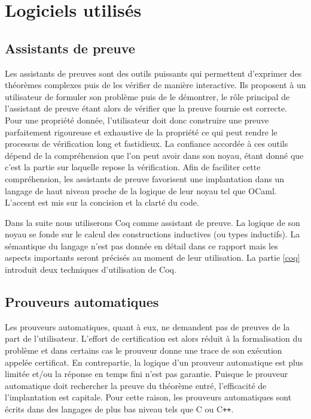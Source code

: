 \documentclass[11pt]{article}
\begin{document}
\newpage
\section{Logiciels utilisés}

\subsection{Assistants de preuve}\label{assistants}

Les assistants de preuves sont des outils puissants qui permettent d'exprimer des théorèmes complexes puis de les vérifier de manière interactive. Ils proposent à un utilisateur de formuler son problème puis de le démontrer, le rôle principal de l'assistant de preuve étant alors de vérifier que la preuve fournie est correcte. Pour une propriété donnée, l'utilisateur doit donc construire une preuve parfaitement rigoureuse et exhaustive de la propriété ce qui peut rendre le processus de vérification long et fastidieux. La confiance accordée à ces outils dépend de la compréhension que l'on peut avoir dans son noyau, étant donné que c'est la partie sur laquelle repose la vérification. Afin de faciliter cette compréhension, les assistants de preuve favorisent une implantation dans un langage de haut niveau proche de la logique de leur noyau tel que OCaml. L'accent est mis sur la concision et la clarté du code. \medbreak

Dans la suite nous utiliserons Coq comme assistant de preuve. La logique de son noyau se fonde sur le calcul des constructions inductives \cite{coq_intro} (ou types inductifs). La sémantique du langage n'est pas donnée en détail dans ce rapport mais les aspects importants seront précisés au moment de leur utilisation. La partie \ref{coq} introduit deux techniques d'utilisation de Coq. 

\subsection{Prouveurs automatiques}\label{prouveurs}

Les prouveurs automatiques, quant à eux, ne demandent pas de preuves de la part de l'utilisateur. L'effort de certification est alors réduit à la formalisation du problème et dans certains cas le prouveur donne une trace de son exécution appelée certificat. En contrepartie, la logique d'un prouveur automatique est plus limitée et/ou la réponse en temps fini n'est pas garantie. Puisque le prouveur automatique doit rechercher la preuve du théorème entré, l'efficacité de l'implantation est capitale. Pour cette raison, les prouveurs automatiques sont écrits dans des langages de plus bas niveau tels que C ou C\texttt{++}. \medbreak
\end{document}
